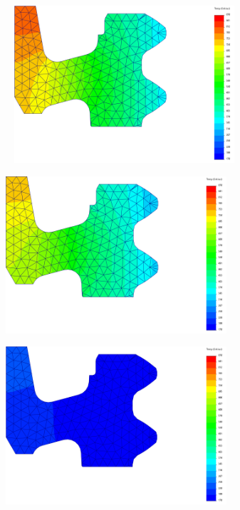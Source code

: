 \begin{figure}[htb]
    \centering
    \begin{subfigure}{.33\textwidth}\
        \centering
        \includegraphics[width = 0.9\textwidth]{Figures/Cap4/AC3_Diametro.png}
        \caption[]%
        {}
        \label{fig:A3_Dint}
    \end{subfigure}%
    \begin{subfigure}{.33\textwidth}
        \centering
        \includegraphics[width = 0.9\textwidth]{Figures/Cap4/AC1_Diametro.png}
        \caption{}
        \label{fig:A1_Dint}
    \end{subfigure}
    \begin{subfigure}{.33\textwidth}
        \centering
        \includegraphics[width = 0.9\textwidth]{Figures/Cap4/TF_Diametro.png}

\end{subfigure}
\end{figure}
